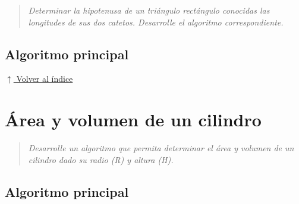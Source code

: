 \documentclass[12pt]{article}
\newcommand{\pseudocodigo}[2]{%
}
\newcommand{\volverindice}{%
    \vspace{1em}%
    \begin{flushright}%
        \hyperlink{indice}{\small $\uparrow$ Volver al índice}%
    \end{flushright}%
}
\newcommand{\enunciado}[1]{%
    \begin{quote}
        \itshape #1
    \end{quote}
}
\begin{document}
\enunciado{Determinar la hipotenusa de un triángulo rectángulo conocidas las longitudes de sus dos catetos. Desarrolle el algoritmo correspondiente.}

\subsection{Algoritmo principal}

\pseudocodigo{ej04_hipotenusa}{Cálculo de la hipotenusa}








\volverindice
\newpage


\section{Área y volumen de un cilindro}

\enunciado{Desarrolle un algoritmo que permita determinar el área y volumen de un cilindro dado su radio (R) y altura (H).}

\subsection{Algoritmo principal}

\pseudocodigo{ej05_area_volumen_cilindro}{Área y volumen de un cilindro}

\end{document}
